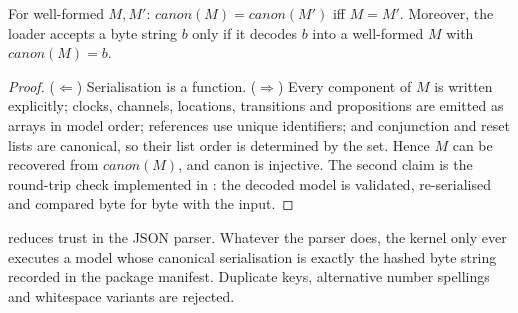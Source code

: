 \begin{lemma}\label{lem:canon}
For well-formed $M,M'$: $\mathit{canon}(M)=\mathit{canon}(M')$ iff $M=M'$. Moreover,
the loader  accepts a byte string $b$ only if it decodes
$b$ into a well-formed $M$ with $\mathit{canon}(M)=b$.
\end{lemma}
\begin{proof}
($\Leftarrow$) Serialisation is a function. ($\Rightarrow$) Every component of $M$
is written explicitly; clocks, channels, locations, transitions and propositions
are emitted as arrays in model order; references use unique identifiers; and
conjunction and reset lists are canonical, so their list order is determined by
the set. Hence $M$ can be recovered from $\mathit{canon}(M)$, and canon is
injective. The second claim is the round-trip check implemented in
: the decoded model is validated, re-serialised and
compared byte for byte with the input.
\end{proof}

\begin{remark}
 reduces trust in the JSON parser. Whatever the parser does,
the kernel only ever executes a model whose canonical serialisation is exactly
the hashed byte string recorded in the package manifest. Duplicate keys,
alternative number spellings and whitespace variants are rejected.
\end{remark}
